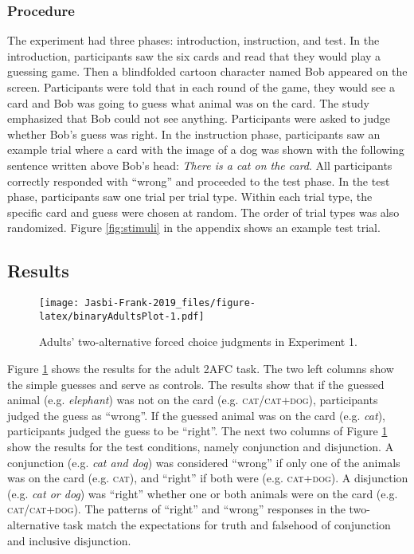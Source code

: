 \documentclass[,man,floatsintext]{apa6}
\begin{document}
\hypertarget{procedure}{%
\subsubsection{Procedure}\label{procedure}}

The experiment had three phases: introduction, instruction, and test. In the introduction, participants saw the six cards and read that they would play a guessing game. Then a blindfolded cartoon character named Bob appeared on the screen. Participants were told that in each round of the game, they would see a card and Bob was going to guess what animal was on the card. The study emphasized that Bob could not see anything. Participants were asked to judge whether Bob's guess was right. In the instruction phase, participants saw an example trial where a card with the image of a dog was shown with the following sentence written above Bob's head: \emph{There is a cat on the card}. All participants correctly responded with \enquote{wrong} and proceeded to the test phase. In the test phase, participants saw one trial per trial type. Within each trial type, the specific card and guess were chosen at random. The order of trial types was also randomized. Figure \ref{fig:stimuli} in the appendix shows an example test trial.

\hypertarget{results}{%
\subsection{Results}\label{results}}

\begin{figure}
\centering
\texttt{[image: Jasbi-Frank-2019\_files/figure-latex/binaryAdultsPlot-1.pdf]}
\caption{\label{fig:binaryAdultsPlot}Adults' two-alternative forced choice judgments in Experiment 1.}
\end{figure}

Figure \ref{fig:binaryAdultsPlot} shows the results for the adult 2AFC task. The two left columns show the simple guesses and serve as controls. The results show that if the guessed animal (e.g. \emph{elephant}) was not on the card (e.g. \textsc{cat/cat+dog}), participants judged the guess as \enquote{wrong}. If the guessed animal was on the card (e.g. \emph{cat}), participants judged the guess to be \enquote{right}. The next two columns of Figure \ref{fig:binaryAdultsPlot} show the results for the test conditions, namely conjunction and disjunction. A conjunction (e.g. \emph{cat and dog}) was considered \enquote{wrong} if only one of the animals was on the card (e.g. \textsc{cat}), and \enquote{right} if both were (e.g. \textsc{cat+dog}). A disjunction (e.g. \emph{cat or dog}) was \enquote{right} whether one or both animals were on the card (e.g. \textsc{cat/cat+dog}). The patterns of \enquote{right} and \enquote{wrong} responses in the two-alternative task match the expectations for truth and falsehood of conjunction and inclusive disjunction.
\end{document}
